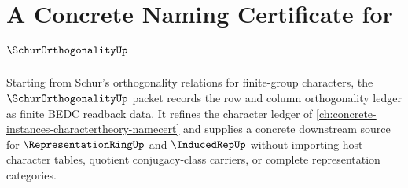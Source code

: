 \chapter{A Concrete Naming Certificate for $\SchurOrthogonalityUp$}
\label{ch:concrete-instances-schurorthogonality-namecert}

Starting from Schur's orthogonality relations for finite-group characters, the $\SchurOrthogonalityUp$ packet records the row and column orthogonality ledger as finite BEDC readback data. It refines the character ledger of \autoref{ch:concrete-instances-charactertheory-namecert} and supplies a concrete downstream source for $\RepresentationRingUp$ and $\InducedRepUp$ without importing host character tables, quotient conjugacy-class carriers, or complete representation categories.

